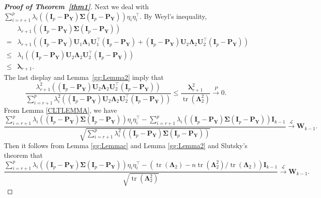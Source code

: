 \documentclass[12pt]{article} %
\DeclareMathOperator{\mytr}{tr}
\newcommand{\bP}{\mathbf{P}}
\newcommand{\bY}{\mathbf{Y}}
\newcommand{\bI}{\mathbf{I}}
\newcommand{\bU}{\mathbf{U}}
\newcommand{\bW}{\mathbf{W}}
\newcommand{\bfsym}[1]{\ensuremath{\boldsymbol{#1}}}
\def\blambda {\bfsym {\lambda}}
\def\bLambda {\bfsym {\Lambda}}
\def\bSigma {\bfsym {\Sigma}}
\theoremstyle{definition}
\begin{document}
\begin{appendices}
\begin{proof}[\textbf{Proof of Theorem~\ref{thm1}}]
    Next we deal with
    $
\sum_{i=r+1}^p \lambda_i ( (\bI_p-\bP_{\bY})\bSigma (\bI_p-\bP_{\bY}))\eta_i \eta_i^\top
$.
By Weyl's inequality, 
\begin{equation*}
    \begin{split}
    &\lambda_{r+1} ( (\bI_p-\bP_{\bY})\bSigma (\bI_p-\bP_{\bY}))
    \\
    =&
    \lambda_{r+1} \left( (\bI_p-\bP_{\bY})\bU_1 \bLambda_1 \bU_1^\top (\bI_p-\bP_{\bY})
        +
     (\bI_p-\bP_{\bY})\bU_2 \bLambda_2 \bU_2^\top (\bI_p-\bP_{\bY})\right)
     \\
     \leq&
     \lambda_{1}\left((\bI_p-\bP_{\bY})\bU_2 \bLambda_2 \bU_2^\top (\bI_p-\bP_{\bY})\right)
     \\
     \leq& \blambda_{r+1}.
    \end{split}
\end{equation*}
The last display and Lemma~\ref{gg:Lemma2} imply that
$$
\frac{\lambda_{r+1}^2\left((\bI_p-\bP_{\bY})\bU_2 \bLambda_2 \bU_2^\top (\bI_p-\bP_{\bY})\right)}{\sum_{i=r+1}^p\lambda_{i}^2\left((\bI_p-\bP_{\bY})\bU_2 \bLambda_2 \bU_2^\top (\bI_p-\bP_{\bY})\right)}
\leq
\frac{
    \blambda_{r+1}^2
}{
    \mytr(\bLambda_2^2)
}
\xrightarrow{P} 0.
$$
From Lemma \ref{CLTLEMMA}, we have
\begin{equation*}
    \frac{
\sum_{i=r+1}^p \lambda_i ( (\bI_p-\bP_{\bY})\bSigma (\bI_p-\bP_{\bY}))\eta_i \eta_i^\top
-
\sum_{i=r+1}^p \lambda_i ( (\bI_p-\bP_{\bY})\bSigma (\bI_p-\bP_{\bY})) \bI_{k-1}
}{
    \sqrt{\sum_{i=r+1}^p \lambda_i^2 ( (\bI_p-\bP_{\bY})\bSigma (\bI_p-\bP_{\bY}))}
}
\xrightarrow{\mathcal{L}} \bW_{k-1}.
\end{equation*}
Then it follows from Lemma \ref{gg:Lemmac} and Lemma \ref{gg:Lemma2} and Slutsky's theorem that
\begin{equation}\label{lushang2}
    \frac{
\sum_{i=r+1}^p \lambda_i ( (\bI_p-\bP_{\bY})\bSigma (\bI_p-\bP_{\bY}))\eta_i \eta_i^\top
-
\left(\mytr(\bLambda_2)-n\mytr(\bLambda_2^2)/\mytr(\bLambda_2)\right)\bI_{k-1}
}{
    \sqrt{\mytr(\bLambda_2^2)}
}
\xrightarrow{\mathcal{L}} \bW_{k-1}.
\end{equation}


\end{proof}
\end{appendices}
\end{document}
